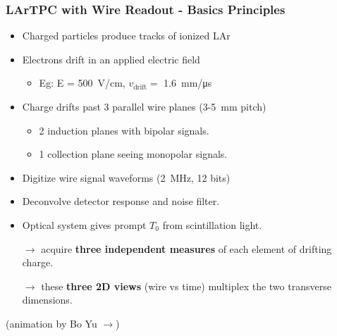 \begin{frame}
  \frametitle{LArTPC with Wire Readout - Basics Principles}

  \begin{itemize}
  \item Charged particles produce tracks of ionized LAr
  \item Electrons drift in an applied electric field 
    \begin{itemize} \footnotesize
    \item Eg: E = \SI{500}{\volt/\cm}, $v_{\mbox{drift}}=$ \SI{1.6}{\milli\meter/\micro\second}
    \end{itemize}
  \item Charge drifts past 3 parallel wire planes (\num{3}-\SI{5}{\milli\meter} pitch)
    \begin{itemize}
    \item 2 induction planes with bipolar signals.
    \item 1 collection plane seeing monopolar signals.
    \end{itemize}
  \item Digitize wire signal waveforms (\SI{2}{\mega\hertz}, 12 bits)
  \item Deconvolve detector response and noise filter.
  \item Optical system gives prompt $T_0$ from scintillation light.
  \end{itemize}

  \begin{itemize}
  \item [$\rightarrow$] acquire \textbf{three independent measures} of each element of drifting charge.
  \item [$\rightarrow$] these \textbf{three 2D views} (wire vs time) multiplex the two transverse dimensions.
  \end{itemize}

  \vfill

  \flushright\footnotesize{(animation by Bo Yu $\rightarrow$)}

\end{frame}

\begin{frame}[fragile]
  \begin{center}
  \end{center}
\end{frame}

